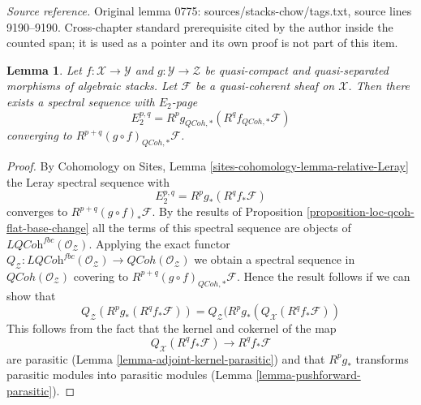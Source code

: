 \documentclass[10pt,a4paper]{amsart}
\theoremstyle{plain}
\newtheorem{lemma}[subsection]{Lemma}
\theoremstyle{definition}
\theoremstyle{remark}
\numberwithin{equation}{subsection}
\def\QCoh{\mathit{QCoh}}
\begin{document}
\noindent\textit{Source reference.} Original lemma 0775: sources/stacks-chow/tags.txt, source lines 9190--9190. Cross-chapter standard prerequisite cited by the author inside the counted span; it is used as a pointer and its own proof is not part of this item.\par\medskip
\begin{lemma}
\label{lemma-relative-leray}
Let $f : \mathcal{X} \to \mathcal{Y}$ and $g : \mathcal{Y} \to \mathcal{Z}$
be quasi-compact and quasi-separated morphisms of algebraic stacks.
Let $\mathcal{F}$ be a quasi-coherent sheaf on $\mathcal{X}$. Then
there exists a spectral sequence with $E_2$-page
$$
E_2^{p, q} = R^pg_{\QCoh, *}(R^qf_{\QCoh, *}\mathcal{F})
$$
converging to $R^{p + q}(g \circ f)_{\QCoh, *}\mathcal{F}$.
\end{lemma}

\begin{proof}
By Cohomology on Sites, Lemma \ref{sites-cohomology-lemma-relative-Leray}
the Leray spectral sequence with
$$
E_2^{p, q} = R^pg_*(R^qf_*\mathcal{F})
$$
converges to $R^{p + q}(g \circ f)_*\mathcal{F}$. By the results of
Proposition \ref{proposition-loc-qcoh-flat-base-change}
all the terms of this spectral sequence are objects of
$\textit{LQCoh}^{fbc}(\mathcal{O}_\mathcal{Z})$. Applying the exact functor
$Q_\mathcal{Z} : \textit{LQCoh}^{fbc}(\mathcal{O}_\mathcal{Z}) \to
\QCoh(\mathcal{O}_\mathcal{Z})$ we obtain a spectral sequence in
$\QCoh(\mathcal{O}_\mathcal{Z})$ covering to
$R^{p + q}(g \circ f)_{\QCoh, *}\mathcal{F}$. Hence
the result follows if we can show that
$$
Q_\mathcal{Z}(R^pg_*(R^qf_*\mathcal{F})) =
Q_\mathcal{Z}(R^pg_*(Q_\mathcal{X}(R^qf_*\mathcal{F}))
$$
This follows from the fact that the kernel and cokernel of the map
$$
Q_\mathcal{X}(R^qf_*\mathcal{F}) \longrightarrow R^qf_*\mathcal{F}
$$
are parasitic (Lemma \ref{lemma-adjoint-kernel-parasitic}) and that
$R^pg_*$ transforms parasitic modules into parasitic modules
(Lemma \ref{lemma-pushforward-parasitic}).
\end{proof}
\end{document}

